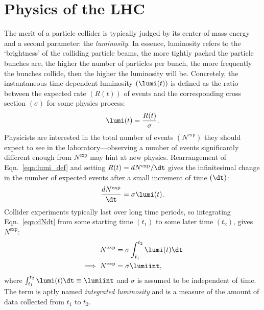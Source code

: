 \section{Physics of the LHC}
The merit of a particle collider is typically judged by its center-of-mass energy and a second parameter: the \emph{luminosity}.
In essence, luminosity refers to the `brightness' of the colliding particle beams,
\ie the more tightly packed the particle bunches are, the higher the number of particles per bunch, the more frequently the bunches collide, then the higher the luminosity will be.
Concretely, the instantaneous time-dependent luminosity $(\lumi(t))$ is defined as the ratio between the expected rate $\left( R(t) \right)$ of events and the corresponding cross section $(\sigma)$ for some physics process:
\begin{equation}
    \lumi(t)= \frac{R(t)}{\sigma}.
    \label{eqn:lumi_def}
\end{equation}
Physicists are interested in the total number of events $\left( N^\text{exp} \right)$ they should expect to see in the laboratory---observing a number of events significantly different enough from $N^\text{exp}$ may hint at new physics.
Rearrangement of Eqn.~\ref{eqn:lumi_def} and setting $R(t) = dN^\text{exp} / \dt$ gives the infinitesimal change in the number of expected events after a small increment of time $(\dt)$:
\begin{equation}
    \frac{dN^\text{exp}}{\dt} = \sigma \lumi(t).
    \label{eqn:dNdt}
\end{equation}
Collider experiments typically last over long time periods, so integrating Eqn.~\ref{eqn:dNdt} from some starting time $\left( t_1 \right)$ to some later time $\left( t_2 \right)$, gives $N^\text{exp}$:
\begin{align*}
    N^\text{exp} &= \sigma \int_{t_1}^{t_2}{\lumi(t) \dt}
    \\
    \implies N^\text{exp} &= \sigma \lumiint,
    \label{eqn:Nexp}
\end{align*}
where $\int_{t_1}^{t_2}{\lumi(t) \dt} \equiv \lumiint$ and $\sigma$ is assumed to be independent of time.
The term \lumiint is aptly named \emph{integrated luminosity} and is a measure of the amount of data collected from $t_1$ to $t_2$.

